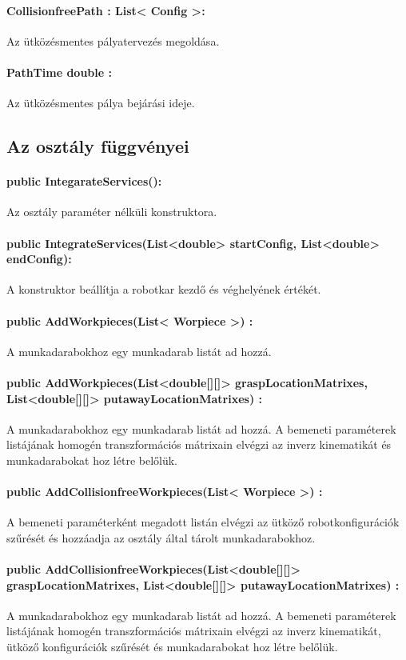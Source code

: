 \paragraph{CollisionfreePath : List< Config >: }

Az ütközésmentes pályatervezés megoldása.

\paragraph{PathTime double :}

Az ütközésmentes pálya bejárási ideje.

\subsection{Az osztály függvényei}

\paragraph{public IntegarateServices(): }
Az osztály paraméter nélküli konstruktora.
\paragraph{public IntegrateServices(List<double> startConfig, List<double> endConfig):}
A konstruktor beállítja a robotkar kezdő és véghelyének értékét.

\paragraph{public AddWorkpieces(List< Worpiece >) :}
A munkadarabokhoz egy munkadarab listát ad hozzá.
\paragraph{public AddWorkpieces(List<double[][]> graspLocationMatrixes, List<double[][]> putawayLocationMatrixes) :}
A munkadarabokhoz egy munkadarab listát ad hozzá. A bemeneti paraméterek listájának homogén transzformációs mátrixain elvégzi az inverz kinematikát és munkadarabokat hoz létre belőlük.
\paragraph{public AddCollisionfreeWorkpieces(List< Worpiece >) :}
A bemeneti paraméterként megadott listán elvégzi az ütköző robotkonfigurációk szűrését és hozzáadja az osztály által tárolt munkadarabokhoz.
\paragraph{public AddCollisionfreeWorkpieces(List<double[][]> graspLocationMatrixes, List<double[][]> putawayLocationMatrixes) :}
A munkadarabokhoz egy munkadarab listát ad hozzá. A bemeneti paraméterek listájának homogén transzformációs mátrixain elvégzi az inverz kinematikát, ütköző konfigurációk szűrését és munkadarabokat hoz létre belőlük.

